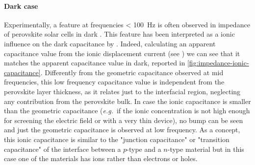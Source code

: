 		\paragraph{Dark case}\label{impedance_lowf_dark}
		Experimentally, a feature at frequencies \SI{< 100}{\Hz} is often observed in impedance of perovskite solar cells in dark \cite{Pockett2015,Juarez-Perez2014,Kim2015c,Guerrero2016,Zarazua2016}.
		This feature has been interpreted as a ionic influence on the dark capacitance by .
		Indeed, calculating an apparent capacitance value from the ionic displacement current (see ) we can see that it matches the apparent capacitance value in dark, reported in \cref{fig:impedance-ionic-capacitance}.
		Differently from the geometric capacitance observed at mid frequencies, this low frequency capacitance value is independent from the perovskite layer thickness, as it relates just to the interfacial region, neglecting any contribution from the perovskite bulk.
		In case the ionic capacitance is smaller than the geometric capacitance (\textsl{e.g.}\ if the ionic concentration is not high enough for screening the electric field or with a very thin device), no bump can be seen and just the geometric capacitance is observed at low frequency.
		As a concept, this ionic capacitance is similar to the "junction capacitance" or "transition capacitance" of the interface between a $p$-type and a $n$-type material but in this case one of the materials has ions rather than electrons or holes.


		\begin{figure}%
		\end{figure}



